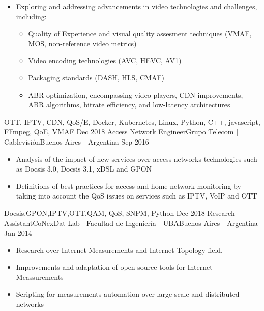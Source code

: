 \begin{experiences}
{\begin{itemize}
                      \item Exploring and addressing advancements in video technologies and challenges, including:
                        \begin{itemize}
                        \item Quality of Experience and visual quality assesment techniques (VMAF, MOS, non-reference video metrics)
                        \item Video encoding technologies (AVC, HEVC, AV1)
                        \item Packaging standards (DASH, HLS, CMAF) 
                        \item ABR optimization, encompassing video players, CDN improvements, ABR algorithms, bitrate efficiency, and low-latency architectures
                        \end{itemize}
                      \end{itemize}
                    }
                    {OTT, IPTV, CDN, QoS/E, Docker, Kubernetes, Linux, Python, C++, javascript, FFmpeg, QoE, VMAF}
  \emptySeparator
  \experience
    {Dec 2018} {Access Network  Engineer}{\color{accentcolor}Grupo Telecom | Cablevisión}{Buenos Aires - Argentina}
    {Sep 2016}    {
                      \begin{itemize}
                      \item Analysis of the impact of new services over access networks technologies such as Docsis 3.0, Docsis 3.1, xDSL and GPON
                      \item Definitions of best practices for access  and home network monitoring by taking into account the QoS issues on services such as IPTV, VoIP and OTT
                      \end{itemize}
                    }
                    {Docsis,GPON,IPTV,OTT,QAM, QoS, SNPM, Python}
  \emptySeparator
  \experience
    {Dec 2018}     {Research Assistant}{\href{https://cnet.fi.uba.ar/en/}{\color{accentcolor}CoNexDat Lab} | Facultad de Ingeniería - UBA}{Buenos Aires - Argentina}
    {Jan 2014}    {
                      \begin{itemize}
                        \item Research over Internet Measurements and Internet Topology field.
                        \item Improvements and adaptation of open source tools for Internet Meassurements
                        \item Scripting for  measurements automation over large scale and distributed networks

\end{itemize}}
\end{experiences}
